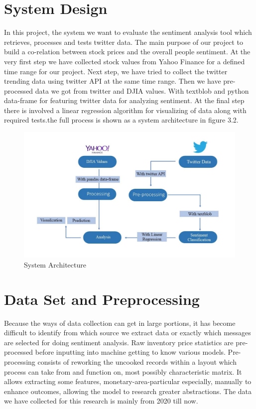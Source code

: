 \section{System Design}
In this project, the system we want to evaluate the sentiment analysis tool which retrieves, processes and tests twitter data. The main purpose of our project to build a co-relation between stock prices and the overall people sentiment. At the very first step we have collected stock values from Yahoo Finance for a defined time range for our project. Next step, we have tried to collect the twitter trending data using twitter API at the same time range. Then we have pre- processed data we got from twitter and DJIA values. With textblob and python data-frame for featuring twitter data for analyzing sentiment. At the final step there is involved a linear regression algorithm for visualizing of data along with required tests.the full process is shown as a system architecture in figure 3.2. \\

\begin{figure}[h]
    \centering
    \includegraphics[scale=.6]{img3/System Architecture.png}
    \caption{System Architecture}
    \label{fig:System Architecture}
\end{figure}


\section{Data Set and Preprocessing}
Because the ways of data collection can get in large portions, it has become difficult to identify from which source we extract data or exactly which messages are selected for doing sentiment analysis. Raw inventory price statistics are pre-processed before inputting into machine getting to know various models. Pre-processing consists of reworking the uncooked records within a layout which process can take from and function on, most possibly characteristic matrix. It allows extracting some features, monetary-area-particular especially, manually to enhance outcomes, allowing the model to research greater abstractions. The data we have collected for this research is mainly from 2020 till now.\\

